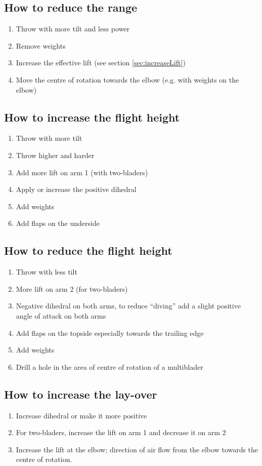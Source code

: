 \subsection{How to reduce the range}
\begin{enumerate}
\item Throw with more tilt and less power
\item Remove weights
\item Increase the effective lift (see section \ref{sec:increaseLift}) 
\item Move the centre of rotation towards the elbow (e.g. with weights on the elbow)
\end{enumerate}

\subsection{How to increase the flight height}
\begin{enumerate}
\item Throw with more tilt 
\item Throw higher and harder 
\item Add more lift on arm 1 (with two-bladers) 
\item Apply or increase the positive dihedral
\item Add weights
\item Add flaps on the underside
\end{enumerate}

\subsection{How to reduce the flight height}
\begin{enumerate}
\item Throw with less tilt 
\item More lift on arm 2 (for two-bladers) 
\item Negative dihedral on both arms, to reduce ``diving'' add a slight positive angle of attack on both arms
\item Add flaps on the topside especially towards the trailing edge
\item Add weights
\item Drill a hole in the area of centre of rotation of a multiblader
\end{enumerate}

\subsection{How to increase the lay-over}
\begin{enumerate}
\item Increase dihedral or make it more positive
\item For two-bladers, increase the lift on arm 1 and decrease it on arm 2 
\item Increase the lift at the elbow; direction of air flow from the elbow towards the centre of rotation.
\end{enumerate}


